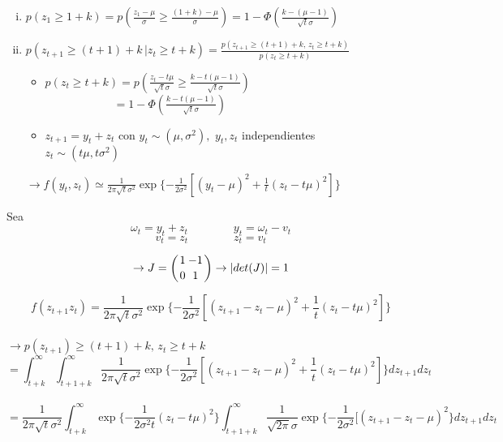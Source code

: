  \begin{enumerate}[(i)]
  \item $p(z_1\ge 1+k)=p{\displaystyle\left(\frac{z_1-\mu}{\sigma}\ge\frac{(1+k)-\mu}{\sigma}\right)=1-\Phi\left(\frac{k-(\mu-1)}{\sqrt{t}\sigma}\right)}$\\

  \item $p(z_{t+1}\ge (t+1)+k\,|z_t\ge t+k)=\displaystyle\frac{p(z_{t+1}\ge (t+1)+k,\,z_t\ge t+k)}{p(z_t\ge t+k)}$\\

     \begin{itemize}
      \item $p(z_t\ge t+k)=p{\displaystyle\left(\frac{z_t-t\mu}{\sqrt{t}\sigma}\ge\frac{k-t(\mu-1)}{\sqrt{t}\sigma}\right)}$\\

      $\qquad\qquad\qquad={\displaystyle 1-\Phi\left(\frac{k-t(\mu-1)}{\sqrt{t}\sigma}\right)}$\\

      \item $z_{t+1}=y_t+z_t$ con $y_t \sim (\mu,\sigma^2),\,\,y_t,z_t$ independientes\\ $z_t\sim(t\mu,t\sigma^2)$
     \end{itemize}
 $\rightarrow f(y_t,z_t)\simeq \displaystyle\frac{1}{2\pi\sqrt{t}\sigma^2}\exp\{-\frac{1}{2\sigma^2}[(y_t-\mu)^2+\frac{1}{t}(z_t-t\mu)^2]\}$
 \end{enumerate}

 Sea \[\omega_t=y_t+z_t\qquad\qquad y_t=\omega_t-v_t\]
 \[v_t=z_t\qquad\qquad z_t=v_t\]

 \[\rightarrow J=\left( {1\atop 0} {-1\atop {1}} \right)\rightarrow |det(J)|=1\]

 \[f(z_{t+1}z_t)=\displaystyle\frac{1}{2\pi\sqrt{t}\sigma^2}\exp\{\displaystyle -\frac{1}{2\sigma^2}[(z_{t+1}-z_t-\mu)^2+\frac{1}{t}(z_t-t\mu)^2]\}\]\\

 $\rightarrow p(z_{t+1})\ge (t+1)+k,\,z_t\ge t+k$\\

 \[={\displaystyle\int_{t+k}^{\infty}\int_{t+1+k}^{\infty}\frac{1}{2\pi\sqrt{t}\sigma^2}\exp\{\displaystyle -\frac{1}{2\sigma^2}[(z_{t+1}-z_t-\mu)^2+\frac{1}{t}(z_t-t\mu)^2]\}}dz_{t+1}dz_t\]\\

 \[{=\displaystyle\frac{1}{2\pi\sqrt{t}\sigma^2}\int_{t+k}^{\infty}\exp\{-\frac{1}{2\sigma^2 t}(z_t-t\mu)^2\}\int_{t+1+k}^{\infty}\frac{1}{\sqrt{2\pi}\sigma}\exp\{\displaystyle -\frac{1}{2\sigma^2}[(z_{t+1}-z_t-\mu)^2\}dz_{t+1}dz_t}\]\\

